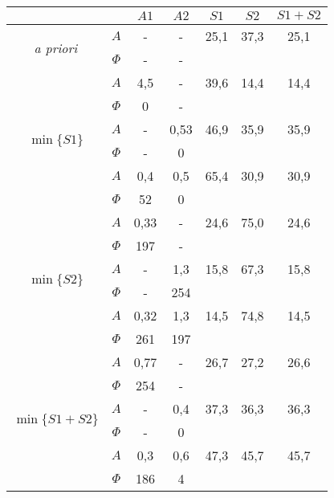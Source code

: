 \documentclass[polish,a4paper,11pt]{mwart}
\begin{document}
  \begin{table}[!tbh]
    \centering
    \begin{tabular}{|c|c|c|c|c|c|c|}
      \cline{3-7}
      \multicolumn{2}{c|}{}&$A1$&$A2$&$S1$&$S2$&$S1+S2$\\\hline
      \multirow{2}{*}{\textit{a priori}} & $A$ & - & - & 25,1 & 37,3 & 25,1\\\cline{2-7}
					 & $\Phi$ & - & - & \multicolumn{3}{c}{}\\\hline
      \multirow{6}{*}{$\min\{S1\}$}   &   $A$ & 4,5 & - & 39,6 & 14,4 & 14,4\\\cline{2-7}
				      &$\Phi$ & 0 & - & \multicolumn{3}{c}{}\\\cline{2-7}
				      &   $A$ & - & 0,53 & 46,9 & 35,9 & 35,9\\\cline{2-7}
				      &$\Phi$ & - & 0 & \multicolumn{3}{c}{}\\\cline{2-7}
				      &   $A$ & 0,4 & 0,5 & 65,4 & 30,9 & 30,9\\\cline{2-7}
				      &$\Phi$ & 52 & 0 & \multicolumn{3}{c}{}\\\hline
      \multirow{6}{*}{$\min\{S2\}$}   &   $A$ & 0,33 & - & 24,6 & 75,0 & 24,6\\\cline{2-7}
				      &$\Phi$ & 197 & - & \multicolumn{3}{c}{}\\\cline{2-7}
				      &   $A$ & - & 1,3 & 15,8 & 67,3 & 15,8\\\cline{2-7}
				      &$\Phi$ & - & 254 & \multicolumn{3}{c}{}\\\cline{2-7}
				      &   $A$ & 0,32 & 1,3 & 14,5 & 74,8 & 14,5\\\cline{2-7}
				      &$\Phi$ & 261 & 197 & \multicolumn{3}{c}{}\\\hline
      \multirow{6}{*}{$\min\{S1+S2\}$}&   $A$ & 0,77 & - & 26,7 & 27,2 & 26,6\\\cline{2-7}
				      &$\Phi$ & 254 & - & \multicolumn{3}{c}{}\\\cline{2-7}
				      &   $A$ & - & 0,4 & 37,3 & 36,3 & 36,3\\\cline{2-7}
				      &$\Phi$ & - & 0 & \multicolumn{3}{c}{}\\\cline{2-7}
				      &   $A$ & 0,3 & 0,6 & 47,3 & 45,7 & 45,7\\\cline{2-7}
				      &$\Phi$ & 186 & 4 & \multicolumn{3}{c}{}\\\cline{1-4}
    \end{tabular}
  \end{table}
\end{document}
